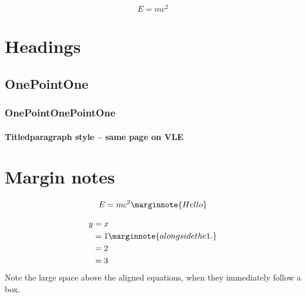 \documentclass[solutionsatend,twocolumnsolutions]{ouunit}
\author{Robert Hasson}
\newenvironment{highlight}[1][]{\begin{style2box}[#1]}{\end{style2box}}
\begin{document}
\makefrontpages
\introduction
\lipsum[133] 

\[
E=mc^2
\]
\lipsum[133]
\section{Headings}
\lipsum[133]
\subsection{OnePointOne}
\lipsum[133]
\subsubsection{OnePointOnePointOne}
\lipsum[133]
\paragraph{Titledparagraph style -- same page on VLE}
\lipsum[133]
\section{Margin notes}
\begin{highlight}
\lipsum[133]

\lipsum[133]
\[
E=mc^2\marginnote{Hello}
\]
\end{highlight}
\lipsum[133]
\begin{highlight}
\lipsum[133]
\end{highlight}
\[%
\begin{aligned}
y &=x\\
&=1\marginnote{alongside the 1.}\\
&=2\\
&=3
\end{aligned}
\]
Note the large space above the aligned equations, when they immediately follow a box.
\begin{highlight}[Title]
\lipsum[133]
\end{highlight}
\end{document}
